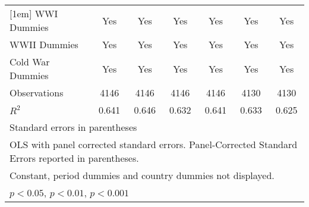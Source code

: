 \begin{table}[htbp]
{\begin{tabular}{l*{6}{c}}
			[1em]
			WWI Dummies         &         Yes         &         Yes         &         Yes         &         Yes         &         Yes         &         Yes         \\
			[1em]
			WWII Dummies        &         Yes         &         Yes         &         Yes         &         Yes         &         Yes         &         Yes         \\
			[1em]
			Cold War Dummies    &         Yes         &         Yes         &         Yes         &         Yes         &         Yes         &         Yes         \\
			\hline
			Observations        &        4146         &        4146         &        4146         &        4146         &        4130         &        4130         \\
			\(R^{2}\)           &       0.641         &       0.646         &       0.632         &       0.641         &       0.633         &       0.625         \\
		\multicolumn{7}{l}{\footnotesize Standard errors in parentheses}\\
\multicolumn{7}{l}{\footnotesize OLS with panel corrected standard errors. Panel-Corrected Standard Errors reported in parentheses.}\\
\multicolumn{7}{l}{\footnotesize Constant, period dummies and country dummies not displayed.}\\
\multicolumn{7}{l}{\footnotesize \sym{*} \(p<0.05\), \sym{**} \(p<0.01\), \sym{***} \(p<0.001\)}\\
\bottomrule
\end{tabular}}
\label{tab:table2}
\end{table}
